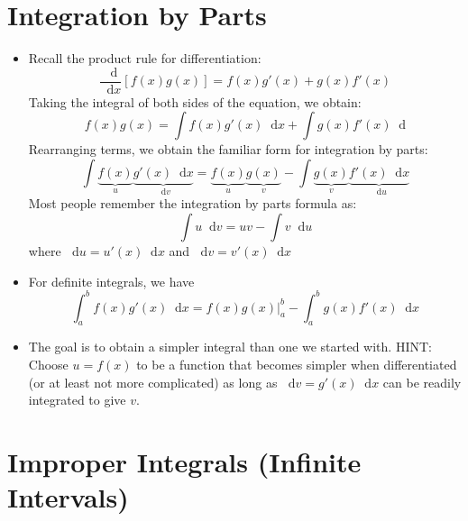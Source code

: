 \documentclass[11pt]{article}
\theoremstyle{definition}
\theoremstyle{remark}
\newcommand*\diff{\mathop{}\!\mathrm{d}}
\begin{document}
\section{Integration by Parts}
\begin{itemize}
\item Recall the product rule for differentiation:
$$
\frac{\diff}{\diff x}[f(x)g(x)] = f(x)g'(x) + g(x)f'(x)
$$
Taking the integral of both sides of the equation, we obtain:
$$
f(x)g(x) = \int f(x)g'(x) \diff x + \int g(x)f'(x) \diff 
$$
Rearranging terms, we obtain the familiar form for integration by parts:
$$
\int \underbrace{f(x)}_{u}\underbrace{g'(x) \diff x}_{\diff v} = \underbrace{f(x)}_{u}\underbrace{g(x)}_v - \int \underbrace{g(x)}_v \underbrace{f'(x) \diff x}_{\diff u}
$$
Most people remember the integration by parts formula as:
$$
\int u \diff v  = uv - \int v \diff u 
$$
where $\diff u = u'(x)\diff x$ and $\diff v = v'(x) \diff x$
\item For definite integrals, we have
$$
\int_a^b f(x)g'(x) \diff  x = f(x)g(x)\big |_a^b - \int_a^b g(x)f'(x) \diff x
$$
\item The goal is to obtain a simpler integral than one we started with. HINT: Choose $u=f(x)$ to be a function that becomes simpler when differentiated (or at least not more complicated) as long as $\diff v = g'(x) \diff x$ can be readily integrated to give $v$.
\end{itemize}

\newpage
\section{Improper Integrals (Infinite Intervals)}
\end{document}
